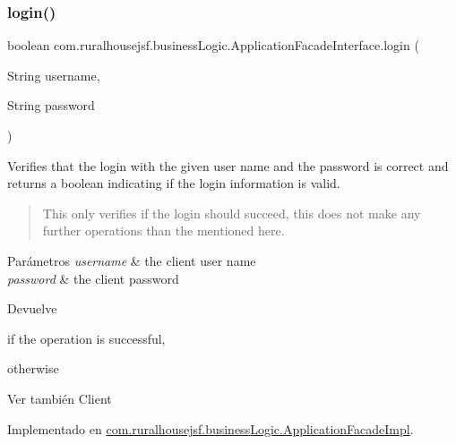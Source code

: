 \subsubsection{\texorpdfstring{login()}{login()}}
{\footnotesize\ttfamily boolean com.\+ruralhousejsf.\+business\+Logic.\+Application\+Facade\+Interface.\+login (\begin{DoxyParamCaption}\item[{String}]{username,  }\item[{String}]{password }\end{DoxyParamCaption})}

Verifies that the login with the given user name and the password is correct and returns a boolean indicating if the login information is valid. \begin{quote}
This only verifies if the login should succeed, this does not make any further operations than the mentioned here. \end{quote}



\begin{DoxyParams}{Parámetros}
{\em username} & the client user name \\
\hline
{\em password} & the client password\\
\hline
\end{DoxyParams}
\begin{DoxyReturn}{Devuelve}

\begin{DoxyCode}{0}
\DoxyCodeLine{\textcolor{keyword}{true} }
\end{DoxyCode}
 if the operation is successful,
\begin{DoxyCode}{0}
\DoxyCodeLine{\textcolor{keyword}{false} }
\end{DoxyCode}
 otherwise
\end{DoxyReturn}
\begin{DoxySeeAlso}{Ver también}
Client 
\end{DoxySeeAlso}


Implementado en \mbox{\hyperlink{classcom_1_1ruralhousejsf_1_1business_logic_1_1_application_facade_impl_a7af883dece6a0de1e1be2b83e3d4a23f}{com.\+ruralhousejsf.\+business\+Logic.\+Application\+Facade\+Impl}}.

\mbox{\label{interfacecom_1_1ruralhousejsf_1_1business_logic_1_1_application_facade_interface_a8bb95aa007a4d95b32ed838ae40406c0}} 
